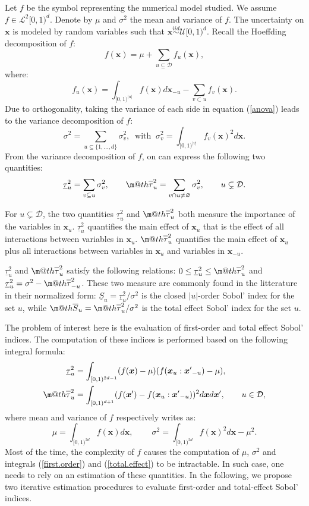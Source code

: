 \documentclass[]{elsarticle}
\makeatletter
\theoremstyle{definition}
\newcommand{\bvec}[1]{\boldsymbol{#1}}
\newcommand{\vx}{\bvec{x}}
\newcommand\iid{\stackrel{iid}{\sim}}
\newcommand*{\ov}[1]{
  \m@th\overline{\mbox{#1}\raisebox{2mm}{}}
}
\makeatother
\begin{document}
Let $f$ be the symbol representing the numerical model studied. We assume $f \in \mathcal{L}^2[0,1)^d$. Denote by $\mu$ and $\sigma^2$ the mean and variance of $f$.
The uncertainty on $\vx$ is modeled by random variables such that $\vx \iid \mathcal{U}[0,1)^d$. Recall the Hoeffding decomposition \cite{Hoeffding} of $f$:
\begin{equation}
f(\vx)=\mu+\sum \limits_{u \subseteq \mathcal{D}} f_u(\vx),
\label{anova}
\end{equation}
where:
\[f_u(\vx)= \int_{[0,1)^{|u|}} f(\vx) d{\vx}_{-u} - \sum \limits_{v \subset u} f_v(\vx).\]
Due to orthogonality, taking the variance of each side in equation (\ref{anova}) leads to the variance decomposition of $f$:
\[ \sigma^2 = \sum \limits_{u \subseteq \{1,\dots,d\}} \sigma_v^2, \ \text{ with } \ \sigma_v^2=\int_{[0,1)^{|v|}} f_v(\vx)^2 d{\vx}.\]
From the variance decomposition of $f$, on can express the following two quantities:
\[\underline{\tau}_u^2 = \sum \limits_{v \subseteq u} \sigma_v^2, \qquad
\ov{$\tau$}_u^2 = \sum \limits_{v \cap u \neq \varnothing} \sigma_v^2, \qquad u \subsetneq \mathcal{D}.\]

For $u \subsetneq \mathcal{D}$, the two quantities $\underline{\tau}_u^2$ and $\ov{$\tau$}_u^2$ both measure the importance of the variables in $\vx_u$. $\underline{\tau}_u^2$ quantifies the main effect of $\vx_u$ that is the effect of all interactions between variables in $\vx_u$. $\ov{$\tau$}_u^2$ quantifies the main effect of $\vx_u$ plus all interactions between variables in $\vx_u$ and variables in $\vx_{-u}$.

$\underline{\tau}_u^2$ and $\ov{$\tau$}_u^2$ satisfy the following relations: $ 0 \leq  \underline{\tau}_u^2 \leq \ov{$\tau$}_u^2$ and $\underline{\tau}_u^2 = \sigma^2 - \ov{$\tau$}_{-u}^2$. These two measure are commonly found in the litterature in their normalized form: $\underline{S}_u = \underline{\tau}_u^2 / \sigma^2$ is the closed $|u|$-order Sobol' index for the set $u$, while $\ov{$S$}_u = \ov{$\tau$}_u^2 / \sigma^2$ is the total effect Sobol' index for the set $u$.
\bigskip

The problem of interest here is the evaluation of first-order and total effect Sobol' indices. The computation of these indices is performed based on the following integral formula:
\begin{align}
\label{first.order}
\underline{\tau}_u^2  &= \int_{[0,1)^{2d-1}} (f(\vx)-\mu)(f(\vx_{u}:{\vx'}_{-u})-\mu), \\
\label{total.effect}
\ov{$\tau$}_u^2 &= \int_{[0,1)^{d+1}}(f(\vx')-f(\vx_u:{\vx'}_{-u}))^2d\vx d{\vx'}, \qquad u \in \mathcal{D},
\end{align}
where mean and variance of $f$ respectively writes as:
\[ \mu = \int_{[0,1)^{2d}} f(\vx) d{\vx}, \ \qquad
\sigma^2 = \int_{[0,1)^{2d}} f(\vx)^2d{\vx} - \mu^2 .\]
Most of the time, the complexity of $f$ causes the computation of $\mu$, $\sigma^2$ and integrals (\ref{first.order}) and (\ref{total.effect}) to be intractable. In such case, one needs to rely on an estimation of these quantities. In the following, we propose two iterative estimation procedures to evaluate first-order and total-effect Sobol' indices.
\end{document}
